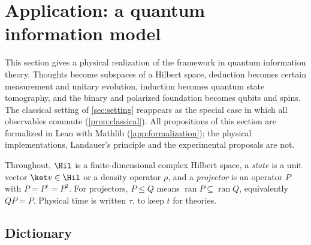 \section{Application: a quantum information model}\label{sec:quantum}

This section gives a physical realization of the framework in quantum information theory. Thoughts
become subspaces of a Hilbert space, deduction becomes certain measurement and unitary evolution,
induction becomes quantum state tomography, and the binary and polarized foundation becomes qubits
and spins. The classical setting of \cref{sec:setting} reappears as the special case in which all
observables commute (\cref{prop:classical}). All propositions of this section are formalized in
Lean with Mathlib (\cref{app:formalization}); the physical implementations, Landauer's principle and
the experimental proposals are not.

Throughout, $\Hil$ is a finite-dimensional complex Hilbert space, a \emph{state} is a unit vector
$\ket v\in\Hil$ or a density operator $\rho$, and a \emph{projector} is an operator $P$ with
$P=P^\dagger=P^2$. For projectors, $P\le Q$ means $\operatorname{ran}P\subseteq\operatorname{ran}Q$,
equivalently $QP=P$. Physical time is written $\tau$, to keep $t$ for theories.

\subsection{Dictionary}

